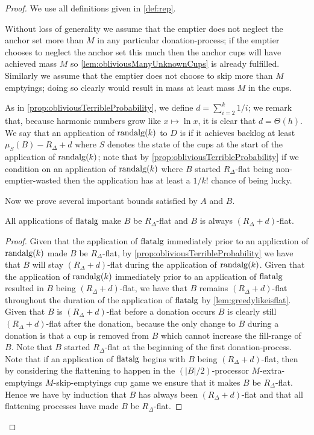 \begin{proof}
  We use all definitions given in \cref{def:rep}.

Without loss of generality we assume that the emptier does not
neglect the anchor set more than $M$ in any particular donation-process;
if the emptier chooses to neglect the anchor set this
much then the anchor cups will have achieved mass $M$ so
\cref{lem:obliviousManyUnknownCups} is already fulfilled. 
Similarly we assume that the emptier does not choose to skip
more than $M$ emptyings; doing so clearly would result in mass
at least mass $M$ in the cups.

As in \cref{prop:obliviousTerribleProbability}, we define $d =
\sum_{i=2}^{k} 1/i$; we remark that, because harmonic numbers
grow like $x\mapsto \ln x$, it is clear that $d=\Theta(h)$. We say that an
application of $\operatorname{\text{\textup{randalg}}}(k)$ to $D$ is  if it
achieves backlog at least $\mu_S(B) - R_\Delta + d$ where $S$
denotes the state of the cups at the start of the application of
$\operatorname{\text{\textup{randalg}}}(k)$; note that by
\cref{prop:obliviousTerribleProbability} if we condition on an
application of $\operatorname{\text{\textup{randalg}}}(k)$ where $B$ started $R_\Delta$-flat
being non-emptier-wasted then the application has at least a
$1/k!$ chance of being lucky.

Now we prove several important bounds satisfied by $A$ and $B$.
\begin{clm}
  \label{clm:allflatteningsworkbyM}
  All applications of $\operatorname{\text{\textup{flatalg}}}$ make $B$ be $R_\Delta$-flat and
  $B$ is always $(R_\Delta + d)$-flat.
\end{clm}
\begin{proof}
  Given that the application of $\operatorname{\text{\textup{flatalg}}}$ immediately prior to an application
  of $\operatorname{\text{\textup{randalg}}}(k)$ made $B$ be $R_\Delta$-flat, by
  \cref{prop:obliviousTerribleProbability} we have that $B$ will
  stay $(R_\Delta + d)$-flat during the application of $\operatorname{\text{\textup{randalg}}}(k)$. 
  Given that the application of $\operatorname{\text{\textup{randalg}}}(k)$ immediately prior to an
  application of $\operatorname{\text{\textup{flatalg}}}$ resulted in $B$ being $(R_\Delta
  + d)$-flat, we have that $B$ remains $(R_\Delta + d)$-flat
  throughout the duration of the application of $\operatorname{\text{\textup{flatalg}}}$ by
  \cref{lem:greedylikeisflat}. Given that $B$ is $(R_\Delta +
  d)$-flat before a donation occurs $B$ is clearly still $(R_\Delta +
  d)$-flat after the donation, because the only change to $B$ during
  a donation is that a cup is removed from $B$ which cannot increase
  the fill-range of $B$.
  Note that $B$ started $R_\Delta$-flat at the beginning of the
  first donation-process.
  Note that if an application of $\operatorname{\text{\textup{flatalg}}}$ begins with $B$ being
  $(R_\Delta + d)$-flat, then by considering the flattening to
  happen in the $(|B|/2)$-processor $M$-extra-emptyings
  $M$-skip-emptyings cup game we ensure that it makes $B$ be
  $R_\Delta$-flat.
  Hence we have by induction that $B$ has always been $(R_\Delta
  + d)$-flat and that all flattening processes have made $B$ be
  $R_\Delta$-flat. 
\end{proof}


\end{proof}
